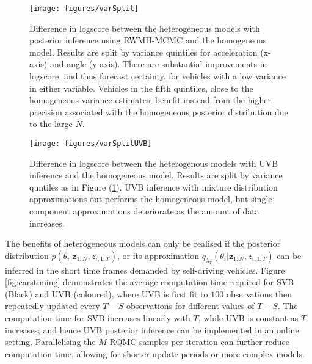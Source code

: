\documentclass[
12pt, %
onehalfspacing, %
nohyperref, %
headsepline, %
chapterinoneline, %
]{MastersDoctoralThesis} %
\begin{document}
\begin{figure}[htbp]
\centering
\texttt{[image: figures/varSplit]}
\caption{Difference in logscore between the heterogeneous models with posterior inference using RWMH-MCMC and the homogeneous model. Results are split by variance quintiles for acceleration (x-axis) and angle (y-axis). There are substantial improvements in logscore, and thus forecast certainty, for vehicles with a low variance in either variable. Vehicles in the fifth quintiles, close to the homogeneous variance estimates, benefit instead from the higher precision associated with the homogeneous posterior distribution due to the large $N$.}
\label{fig:carsvarSplit}
\end{figure}

\begin{figure}[htbp]
\centering
\texttt{[image: figures/varSplitUVB]}
\caption{Difference in logscore between the heterogenous models with UVB inference and the homogeneous model. Results are split by variance quntiles as in Figure (\ref{fig:carsvarSplit}). UVB inference with mixture distribution approximations out-performs the homogeneous model, but single component approximations deteriorate as the amount of data increases.}
\label{fig:carsvarSplitUVB}
\end{figure}


The benefits of heterogeneous models can only be realised if the posterior distribution $p(\theta_{i} | \textbf{z}_{1:N}, z_{i, 1:T})$, or its approximation $q_{\lambda_T}(\theta_{i} | \textbf{z}_{1:N}, z_{i, 1:T})$ can be inferred in the short time frames demanded by self-driving vehicles. Figure \ref{fig:carstiming} demonstrates the average computation time required for SVB (Black) and UVB (coloured), where UVB is first fit to $100$ observations then repeatedly updated every $T-S$ observations for different values of $T-S$. The computation time for SVB increases linearly with $T$, while UVB is constant as $T$ increases; and hence UVB posterior inference can be implemented in an online setting. Parallelising the $M$ RQMC samples per iteration can further reduce computation time, allowing for shorter update periods or more complex models. 
\\ 
\end{document}
